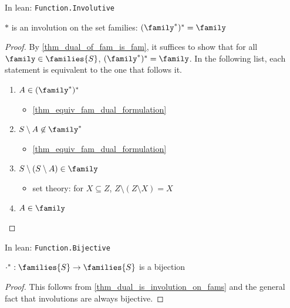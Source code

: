 \begin{leanrmk}
    In lean: \verb|Function.Involutive|
\end{leanrmk}

\begin{theorem}
    \label{thm_dual_is_involution_on_fams}
    $*$ is an involution on the set families: $(\family^*)^* = \family$
\end{theorem}

\begin{proof}
    \leanok{}
    By \cref{thm_dual_of_fam_is_fam}, it suffices to show that for all $\family \in \families{S}$, $(\family^*)^* = \family$.
    In the following list, each statement is equivalent to the one that follows it.
    \begin{enumerate}
        \item $A \in (\family^*)^*$
        \begin{itemize}
            \item[--] \cref{thm_equiv_fam_dual_formulation}
        \end{itemize}
        \item $S \setminus A \not\in \family^*$
        \begin{itemize}
            \item[--] \cref{thm_equiv_fam_dual_formulation}
        \end{itemize}
        \item $S \setminus (S \setminus A) \in \family$
        \begin{itemize}
            \item[--] set theory: for $X \subseteq Z$, $Z \setminus (Z \setminus X) = X$
        \end{itemize}
        \item $A \in \family$
    \end{enumerate}
\end{proof}

\begin{leanrmk}
    In lean: \verb|Function.Bijective|
\end{leanrmk}

\begin{theorem}
    \label{thm_dual_is_bijection_on_fams}
    $\cdot^*: \families{S} \to \families{S}$ is a bijection
\end{theorem}

\begin{proof}
    This follows from \cref{thm_dual_is_involution_on_fams} and the general fact that involutions are always bijective.  
\end{proof}

